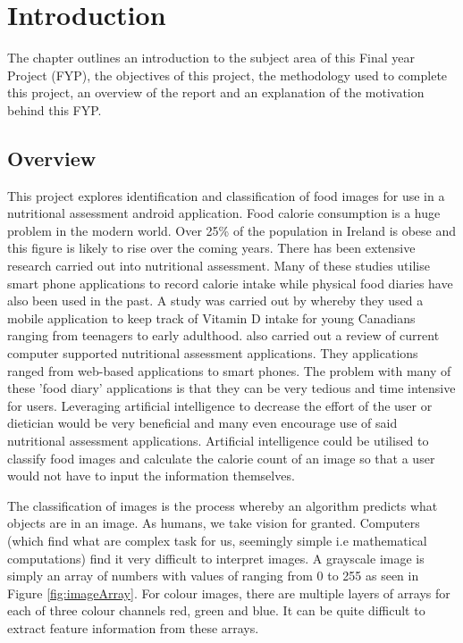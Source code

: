 \chapter{Introduction}
\label{intro}
The chapter outlines an introduction to the subject area of this Final year Project (FYP), the objectives of this project, the methodology used to complete this project, an overview of the report and an explanation of the motivation behind this FYP.

\section{Overview}
This project explores identification and classification of food images for use in a nutritional assessment android application.
Food calorie consumption is a huge problem in the modern world.
Over 25\% of the population in Ireland is obese and this figure is likely to rise over the coming years.
There has been extensive research carried out into nutritional assessment.
Many of these studies utilise smart phone applications to record calorie intake while physical food diaries have also been used in the past.
A study was carried out by \parencite{goodman2015vitamin} whereby they used a mobile application to keep track of Vitamin D intake for young Canadians ranging from teenagers to early adulthood.
\parencite{arens2015promising} also carried out a review of current computer supported nutritional assessment applications. They applications ranged from web-based applications to smart phones.
The problem with many of these 'food diary' applications is that they can be very tedious and time intensive for users.
Leveraging artificial intelligence to decrease the effort of the user or dietician would be very beneficial and many even encourage use of said nutritional assessment applications.
Artificial intelligence could be utilised to classify food images and calculate the calorie count of an image so that a user would not have to input the information themselves.

The classification of images is the process whereby an algorithm predicts what objects are in an image.
As humans, we take vision for granted.
Computers (which find what are complex task for us, seemingly simple i.e mathematical computations) find it very difficult to interpret images.
A grayscale image is simply an array of numbers with values of ranging from 0 to 255 as seen in Figure \ref{fig:imageArray}. 
For colour images, there are multiple layers of arrays for each of three colour channels red, green and blue.
It can be quite difficult to extract feature information from these arrays.

